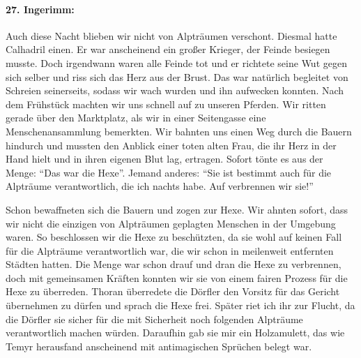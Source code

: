 \paragraph{27. Ingerimm:}
Auch diese Nacht blieben wir nicht von Alpträumen verschont. Diesmal hatte Calhadril einen. Er war anscheinend ein großer Krieger, der Feinde besiegen musste. Doch irgendwann waren alle Feinde tot und er richtete seine Wut gegen sich selber und riss sich das Herz aus der Brust. Das war natürlich begleitet von Schreien seinerseits, sodass wir wach wurden und ihn aufwecken konnten. Nach dem Frühstück machten wir uns schnell auf zu unseren Pferden. Wir ritten gerade über den Marktplatz, als wir in einer Seitengasse eine Menschenansammlung bemerkten. Wir bahnten uns einen Weg durch die Bauern hindurch und mussten den Anblick einer toten alten Frau, die ihr Herz in der Hand hielt und in ihren eigenen Blut lag, ertragen. Sofort tönte es aus der Menge: ``Das war die Hexe''. Jemand anderes: ``Sie ist bestimmt auch für die Alpträume verantwortlich, die ich nachts habe. Auf verbrennen wir sie!'' 


Schon bewaffneten sich die Bauern und zogen zur Hexe. Wir ahnten sofort, dass wir nicht die einzigen von Alpträumen geplagten Menschen in der Umgebung waren. So beschlossen wir die Hexe zu beschützten, da sie wohl auf keinen Fall für die Alpträume verantwortlich war, die wir schon in meilenweit entfernten Städten hatten. Die Menge war schon drauf und dran die Hexe zu verbrennen, doch mit gemeinsamen Kräften konnten wir sie von einem fairen Prozess für die Hexe zu überreden. Thoran überredete die Dörfler den Vorsitz für das Gericht übernehmen zu dürfen und sprach die Hexe frei. Später riet ich ihr zur Flucht, da die Dörfler sie sicher für die mit Sicherheit noch folgenden Alpträume verantwortlich machen würden. Daraufhin gab sie mir ein Holzamulett, das wie Temyr herausfand anscheinend mit antimagischen Sprüchen belegt war.


